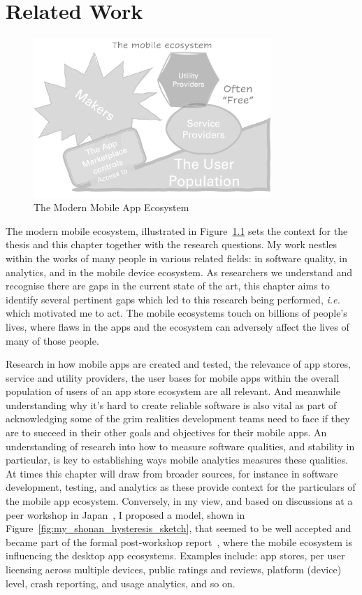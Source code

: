 \chapter{Related Work}
\begin{figure}
    \centering
    \includegraphics[width=0.8\textwidth]{images/my/the_mobile_ecosystem_sketch.png}
    \caption{The Modern Mobile App Ecosystem}
    \label{fig:my_modern-mobile-app-ecosystem}
\end{figure}

The modern mobile ecosystem, illustrated in Figure~\ref{fig:my_modern-mobile-app-ecosystem} sets the context for the thesis and this chapter together with the research questions. 
My work nestles within the works of many people in various related fields: in software quality, in analytics, and in the mobile device ecosystem. As researchers we understand and recognise there are gaps in the current state of the art, this chapter aims to identify several pertinent gaps which led to this research being performed, \emph{i.e.} which motivated me to act. The mobile ecosystems touch on billions of people's lives, where flaws in the apps and the ecosystem can adversely affect the lives of many of those people. 

Research in how mobile apps are created and tested, the relevance of app stores, service and utility providers, the user bases for mobile apps within the overall population of users of an app store ecosystem are all relevant. And meanwhile understanding why it's hard to create reliable software is also vital as part of acknowledging some of the grim realities development teams need to face if they are to succeed in their other goals and objectives for their mobile apps. An understanding of research into how to measure software qualities, and stability in particular, is key to establishing ways mobile analytics measures these qualities. At times this chapter will draw from broader sources, for instance in software development, testing, and analytics as these provide context for the particulars of the mobile app ecosystem. Conversely, in my view, and based on discussions at a peer workshop in Japan~\citep{nii_shonan_workshop_152}, I proposed a model, shown in Figure~\ref{fig:my_shonan_hysteresis_sketch}, that seemed to be well accepted and became part of the formal post-workshop report~\citep{nii_shonan_152_workshop_report}, where the mobile ecosystem is influencing the desktop app ecosystems. Examples include: app stores, per user licensing across multiple devices, public ratings and reviews, platform (device) level, crash reporting, and usage analytics, and so on.

